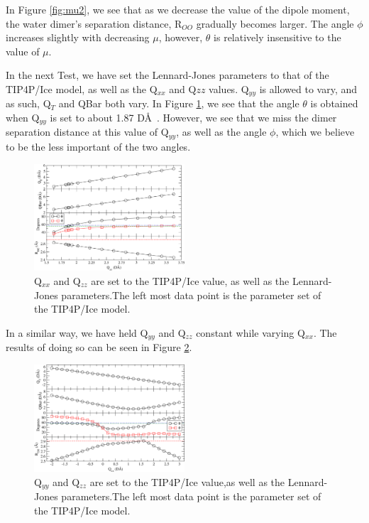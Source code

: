 \documentclass[aps, jcp, prl, reprint, groupedaddress, superscriptaddress, twocolumn]{revtex4-1}
\begin{document}
In Figure \ref{fig:mu2}, we see that as we decrease the value of the dipole 
moment, the water dimer's separation distance, R$_{OO}$ gradually becomes 
larger. The angle $\phi$ increases slightly with decreasing $\mu$, however, 
$\theta$ is relatively insensitive to the value of $\mu$.
 
In the next Test, we have set the Lennard-Jones parameters to that of the
TIP4P/Ice model, as well as the Q$_{xx}$ and Q${zz}$ values. Q$_{yy}$ is 
allowed to vary, and as such, Q$_T$ and QBar both vary. In Figure
\ref{fig:Qyy3}, we see that the angle $\theta$ is obtained when Q$_{yy}$
is set to about 1.87 D\AA~. However, we see that we miss the dimer 
separation distance at this value of Q$_{yy}$, as well as the angle
$\phi$, which we believe to be the less important of the two angles.

\begin{figure}[h!]
\includegraphics[width=0.5\textwidth]{Test23_plot.pdf}
\caption{\label{fig:Qyy3} Q$_{xx}$ and Q$_{zz}$ are set to the TIP4P/Ice value, as well as the Lennard-Jones parameters.The left most data point is the parameter set of the TIP4P/Ice model.}
\end{figure}

In a similar way, we have held Q$_{yy}$ and Q$_{zz}$ constant while varying
Q$_{xx}$. The results of doing so can be seen in Figure \ref{fig:Qyy4}.

\begin{figure}[h!]
\includegraphics[width=0.5\textwidth]{Test24_plot.pdf}
\caption{\label{fig:Qyy4} Q$_{yy}$ and Q$_{zz}$ are set to the TIP4P/Ice value,as well as the Lennard-Jones parameters.The left most data point is the parameter set of the TIP4P/Ice model.}
\end{figure}
\end{document}
